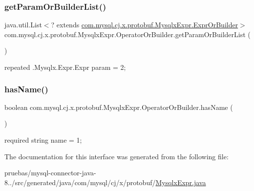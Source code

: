 \subsubsection{\texorpdfstring{get\+Param\+Or\+Builder\+List()}{getParamOrBuilderList()}}
{\footnotesize\ttfamily java.\+util.\+List$<$? extends \mbox{\hyperlink{interfacecom_1_1mysql_1_1cj_1_1x_1_1protobuf_1_1_mysqlx_expr_1_1_expr_or_builder}{com.\+mysql.\+cj.\+x.\+protobuf.\+Mysqlx\+Expr.\+Expr\+Or\+Builder}}$>$ com.\+mysql.\+cj.\+x.\+protobuf.\+Mysqlx\+Expr.\+Operator\+Or\+Builder.\+get\+Param\+Or\+Builder\+List (\begin{DoxyParamCaption}{ }\end{DoxyParamCaption})}

{\ttfamily repeated .Mysqlx.\+Expr.\+Expr param = 2;} \mbox{\label{interfacecom_1_1mysql_1_1cj_1_1x_1_1protobuf_1_1_mysqlx_expr_1_1_operator_or_builder_a2308890fccea041bbce31293bcfded83}} 
\subsubsection{\texorpdfstring{has\+Name()}{hasName()}}
{\footnotesize\ttfamily boolean com.\+mysql.\+cj.\+x.\+protobuf.\+Mysqlx\+Expr.\+Operator\+Or\+Builder.\+has\+Name (\begin{DoxyParamCaption}{ }\end{DoxyParamCaption})}

{\ttfamily required string name = 1;} 

The documentation for this interface was generated from the following file\+:\begin{DoxyCompactItemize}
\item 
pruebas/mysql-\/connector-\/java-\/8../src/generated/java/com/mysql/cj/x/protobuf/\mbox{\hyperlink{_mysqlx_expr_8java}{Mysqlx\+Expr.\+java}}\end{DoxyCompactItemize}
